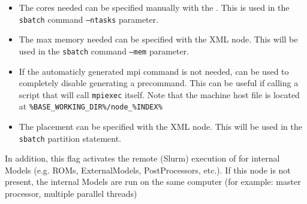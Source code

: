 \begin{itemize}
\begin{itemize}
\begin{itemize}
\begin{itemize}
                introducing a sub-node named  (e.g.\\
\texttt{slurm}\texttt{/tmp/nodes}).
                \item If none of the above options are used, RAVEN will attempt
                  to find the nodes' information by using: \texttt{srun --overlap -- hostname} 
           \end{itemize}
         \item The cores needed can be specified manually with the
           .  This is used in the
           \texttt{sbatch} command \texttt{--ntasks} parameter.
         \item The max memory needed can be specified with the
            XML node.  This will be used in the
           \texttt{sbatch} command \texttt{--mem} parameter.
         \item If the automaticly generated mpi command is not needed,
            can be used to completely disable
           generating a precommand. This can be useful if calling a
           script that will call \texttt{mpiexec} itself.  Note that
           the machine host file is located at
           \texttt{\%BASE\_WORKING\_DIR\%/node\_\%INDEX\%}
         \item The placement can be specified with the 
           XML node.  This will be used in the \texttt{sbatch} partition
           statement.
         \end{itemize}
         In addition, this flag activates the remote (Slurm) execution of   for internal Models (e.g. ROMs,
         ExternalModels, PostProcessors, etc.). If this node is not present, the internal Models
           are run on the same computer (for example: master processor, multiple parallel threads)
   \end{itemize}


\end{itemize}
